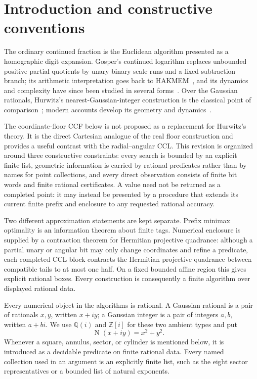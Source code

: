 \documentclass[10pt]{article}
\theoremstyle{definition}
\theoremstyle{remark}
\newcommand{\Qi}{\mathbb{Q}(i)}
\newcommand{\Zi}{\mathbb{Z}[i]}
\newcommand{\Norm}{\operatorname{N}}
\begin{document}
\ifCCLone
\section{Introduction and constructive conventions}

The ordinary continued fraction is the Euclidean algorithm presented as a homographic digit expansion.  Gosper's continued logarithm replaces unbounded positive partial quotients by unary binary scale runs and a fixed subtraction branch; its arithmetic interpretation goes back to HAKMEM~\cite{hakmem}, and its dynamics and complexity have since been studied in several forms~\cite{borwein-cl,borwein-generalized,collins,shallit}.  Over the Gaussian rationals, Hurwitz's nearest-Gaussian-integer construction is the classical point of comparison~\cite{hurwitz}; modern accounts develop its geometry and dynamics~\cite{hockman,kirsebom,gonzalez}.

The coordinate-floor CCF below is not proposed as a replacement for Hurwitz's theory.  It is the direct Cartesian analogue of the real floor construction and provides a useful contrast with the radial--angular CCL.  This revision is organized around three constructive constraints: every search is bounded by an explicit finite list, geometric information is carried by rational predicates rather than by names for point collections, and every direct observation consists of finite bit words and finite rational certificates.  A value need not be returned as a completed point: it may instead be presented by a procedure that extends its current finite prefix and enclosure to any requested rational accuracy.

Two different approximation statements are kept separate.  Prefix minimax optimality is an information theorem about finite tags.  Numerical enclosure is supplied by a contraction theorem for Hermitian projective quadrance: although a partial unary or angular bit may only change coordinates and refine a predicate, each completed CCL block contracts the Hermitian projective quadrance between compatible tails to at most one half.  On a fixed bounded affine region this gives explicit rational boxes.  Every construction is consequently a finite algorithm over displayed rational data.

Every numerical object in the algorithms is rational.  A Gaussian rational is a pair of rationals $x,y$, written $x+iy$; a Gaussian integer is a pair of integers $a,b$, written $a+bi$.  We use $\Qi$ and $\Zi$ for these two ambient types and put
\[
 \Norm(x+iy)=x^2+y^2.
\]
Whenever a square, annulus, sector, or cylinder is mentioned below, it is introduced as a decidable predicate on finite rational data.  Every named collection used in an argument is an explicitly finite list, such as the eight sector representatives or a bounded list of natural exponents.
\end{document}
